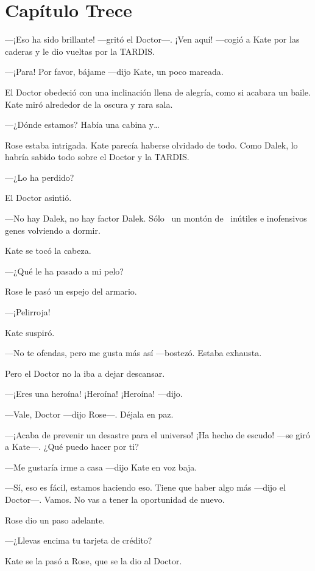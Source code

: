 \chapter*{Capítulo Trece}

---¡Eso ha sido brillante! ---gritó el Doctor---. ¡Ven aquí! ---cogió a Kate
por las caderas y le dio vueltas por la TARDIS.

---¡Para! Por favor, bájame ---dijo Kate, un poco mareada.

El Doctor obedeció con una inclinación llena de alegría, como si acabara
un baile. Kate miró alrededor de la oscura y rara sala.

---¿Dónde estamos? Había una cabina y\ldots{}

Rose estaba intrigada. Kate parecía haberse olvidado de todo. Como
Dalek, lo habría sabido todo sobre el Doctor y la TARDIS.

---¿Lo ha perdido?

El Doctor asintió.

---No hay Dalek, no hay factor Dalek. Sólo ~un montón de ~inútiles e
inofensivos genes volviendo a dormir.

Kate se tocó la cabeza.

---¿Qué le ha pasado a mi pelo?

Rose le pasó un espejo del armario.

---¡Pelirroja!

Kate suspiró.

---No te ofendas, pero me gusta más así ---bostezó. Estaba exhausta.

Pero el Doctor no la iba a dejar descansar.

---¡Eres una heroína! ¡Heroína! ¡Heroína! ---dijo.

---Vale, Doctor ---dijo Rose---. Déjala en paz.

---¡Acaba de prevenir un desastre para el universo! ¡Ha hecho de escudo!
---se giró a Kate---. ¿Qué puedo hacer por ti?

---Me gustaría irme a casa ---dijo Kate en voz baja.

---Sí, eso es fácil, estamos haciendo eso. Tiene que haber algo más
---dijo el Doctor---. Vamos. No vas a tener la oportunidad de nuevo.

Rose dio un paso adelante.

---¿Llevas encima tu tarjeta de crédito?

Kate se la pasó a Rose, que se la dio al Doctor.

